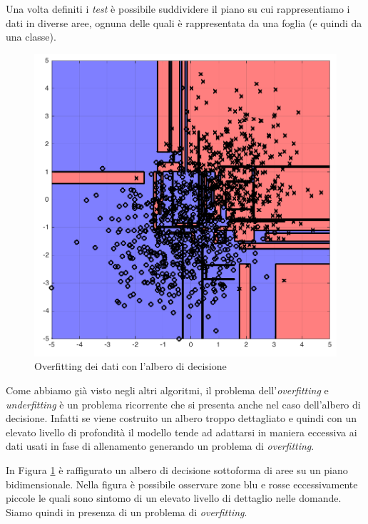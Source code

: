 \documentclass[12pt,italian]{report}
\begin{document}
Una volta definiti i \emph{test} è possibile suddividere il piano su cui rappresentiamo i dati in diverse aree, ognuna delle quali è rappresentata da una foglia (e quindi da una classe).

\begin{figure}[h!]
	\center
	\includegraphics[scale=0.2]{../img/overfit_decision_trees1} %
	\caption{Overfitting dei dati con l'albero di decisione}
	\label{fig:overfit_decision_trees1}
\end{figure}

Come abbiamo già visto negli altri algoritmi, il problema dell'\emph{overfitting} e \emph{underfitting} è un problema ricorrente che si presenta anche nel caso dell'albero di decisione.
Infatti se viene costruito un albero troppo dettagliato e quindi con un elevato livello di profondità il modello tende ad adattarsi in maniera eccessiva ai dati usati in fase di allenamento generando un problema di \emph{overfitting}. 

In Figura \ref{fig:overfit_decision_trees1} è raffigurato un albero di decisione sottoforma di aree su un piano bidimensionale. Nella figura è possibile osservare zone blu e rosse eccessivamente piccole le quali sono sintomo di un elevato livello di dettaglio nelle domande. Siamo quindi in presenza di un problema di \emph{overfitting}.
\end{document}
